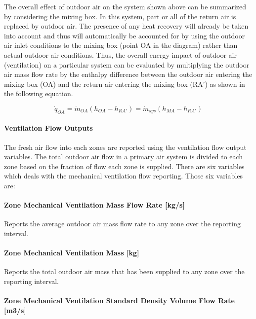The overall effect of outdoor air on the system shown above can be summarized by considering the mixing box. In this system, part or all of the return air is replaced by outdoor air. The presence of any heat recovery will already be taken into account and thus will automatically be accounted for by using the outdoor air inlet conditions to the mixing box (point OA in the diagram) rather than actual outdoor air conditions. Thus, the overall energy impact of outdoor air (ventilation) on a particular system can be evaluated by multiplying the outdoor air mass flow rate by the enthalpy difference between the outdoor air entering the mixing box (OA) and the return air entering the mixing box (RA') as shown in the following equation.

\begin{equation}
{\dot q_{OA}} = {\dot m_{OA}}\left( {{h_{OA}} - {h_{RA'}}} \right) = {\dot m_{sys}}\left( {{h_{MA}} - {h_{RA'}}} \right)
\end{equation}

\paragraph{Ventilation Flow Outputs}\label{ventilation-flow-outputs}

The fresh air flow into each zones are reported using the ventilation flow output variables. The total outdoor air flow in a primary air system is divided to each zone based on the fraction of flow each zone is supplied. There are six variables which deals with the mechanical ventilation flow reporting. Those six variables are:

\paragraph{Zone Mechanical Ventilation Mass Flow Rate {[}kg/s{]}}\label{zone-mechanical-ventilation-mass-flow-rate-kgs}

Reports the average outdoor air mass flow rate to any zone over the reporting interval.

\paragraph{Zone Mechanical Ventilation Mass {[}kg{]}}\label{zone-mechanical-ventilation-mass-kg}

Reports the total outdoor air mass that has been supplied to any zone over the reporting interval.

\paragraph{Zone Mechanical Ventilation Standard Density Volume Flow Rate {[}m3/s{]}}\label{zone-mechanical-ventilation-standard-density-volume-flow-rate-m3s}

